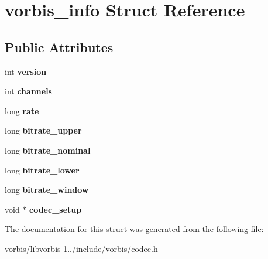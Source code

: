 \hypertarget{structvorbis__info}{\section{vorbis\+\_\+info Struct Reference}
\label{structvorbis__info}
}
\subsection*{Public Attributes}
\begin{DoxyCompactItemize}
\item 
\hypertarget{structvorbis__info_a2d832259b1e3fbf4d1cd619ab5743612}{int {\bfseries version}}\label{structvorbis__info_a2d832259b1e3fbf4d1cd619ab5743612}

\item 
\hypertarget{structvorbis__info_a4240e042b91744b4fd810426f18252b4}{int {\bfseries channels}}\label{structvorbis__info_a4240e042b91744b4fd810426f18252b4}

\item 
\hypertarget{structvorbis__info_a01879ed23ecd9605cf6779ef2663a681}{long {\bfseries rate}}\label{structvorbis__info_a01879ed23ecd9605cf6779ef2663a681}

\item 
\hypertarget{structvorbis__info_a2d9d0e0725ae71c855ad39ce07bf7c88}{long {\bfseries bitrate\+\_\+upper}}\label{structvorbis__info_a2d9d0e0725ae71c855ad39ce07bf7c88}

\item 
\hypertarget{structvorbis__info_a71127d3e35c30fa110d7f321302a91b8}{long {\bfseries bitrate\+\_\+nominal}}\label{structvorbis__info_a71127d3e35c30fa110d7f321302a91b8}

\item 
\hypertarget{structvorbis__info_a216284288febd46a5547901cd5e6cd62}{long {\bfseries bitrate\+\_\+lower}}\label{structvorbis__info_a216284288febd46a5547901cd5e6cd62}

\item 
\hypertarget{structvorbis__info_aa511ecfc9eee8129df8f70e62ed08dc7}{long {\bfseries bitrate\+\_\+window}}\label{structvorbis__info_aa511ecfc9eee8129df8f70e62ed08dc7}

\item 
\hypertarget{structvorbis__info_a440988f081a417fd1586a4c3d44bc00c}{void $\ast$ {\bfseries codec\+\_\+setup}}\label{structvorbis__info_a440988f081a417fd1586a4c3d44bc00c}

\end{DoxyCompactItemize}


The documentation for this struct was generated from the following file\+:\begin{DoxyCompactItemize}
\item 
vorbis/libvorbis-\/1../include/vorbis/codec.\+h\end{DoxyCompactItemize}

